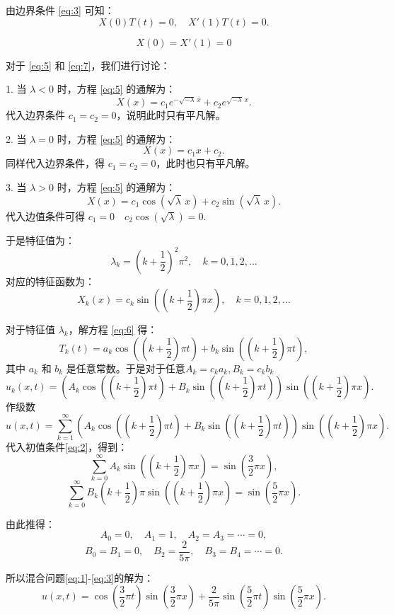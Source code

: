 由边界条件 \eqref{eq:3} 可知：
\begin{equation}
    X(0) T(t) = 0, \quad X'(1) T(t) = 0. \nonumber
\end{equation}

\begin{equation}
X(0) = X'(1) = 0 \label{eq:7}
\end{equation}

对于 \eqref{eq:5} 和 \eqref{eq:7}，我们进行讨论：

1. 当 $\lambda < 0$ 时，方程 \eqref{eq:5} 的通解为：
   \[
   X(x) = c_1 e^{-\sqrt{-\lambda} \, x} + c_2 e^{\sqrt{-\lambda} \, x}.
   \]
   代入边界条件 $c_1 = c_2 = 0$，说明此时只有平凡解。

2. 当 $\lambda = 0$ 时，方程 \eqref{eq:5} 的通解为：
   \[
   X(x) = c_1 x + c_2.
   \]
   同样代入边界条件，得 $c_1 = c_2 = 0$，此时也只有平凡解。

3. 当 $\lambda > 0$ 时，方程 \eqref{eq:5} 的通解为：
   \[
   X(x) = c_1 \cos(\sqrt{\lambda} \, x) + c_2 \sin(\sqrt{\lambda} \, x).
   \]
   代入边值条件可得 $c_1 = 0 \quad c_2 \cos(\sqrt{\lambda}) = 0.$

   于是特征值为：
   \[
   \lambda_k = \left(k + \frac{1}{2}\right)^2 \pi^2, \quad k = 0, 1, 2, \dots
   \]
   对应的特征函数为：
   \[
   X_k(x) = c_k \sin\left(\left(k + \frac{1}{2}\right) \pi x\right), \quad k = 0, 1, 2, \dots
   \]

对于特征值 $\lambda_k$，解方程 \eqref{eq:6} 得：
\[
T_k(t) = a_k \cos\left(\left(k + \frac{1}{2}\right) \pi t\right) + b_k \sin\left(\left(k + \frac{1}{2}\right) \pi t\right),
\]
其中 $a_k$ 和 $b_k$ 是任意常数。于是对于任意$A_k=c_ka_k,B_k=c_kb_k$
\[
u_k(x, t) = \left(A_k \cos\left(\left(k + \frac{1}{2}\right) \pi t\right) + B_k \sin\left(\left(k + \frac{1}{2}\right) \pi t\right)\right) \sin\left(\left(k + \frac{1}{2}\right) \pi x\right).
\]
作级数
\[
u(x, t) = \sum_{k=1}^{\infty} \left(A_k \cos\left(\left(k + \frac{1}{2}\right) \pi t\right) + B_k \sin\left(\left(k + \frac{1}{2}\right) \pi t\right)\right) \sin\left(\left(k + \frac{1}{2}\right) \pi x\right).
\]
代入初值条件\eqref{eq:2}，得到：
\[
\sum_{k=0}^{\infty} A_k \sin\left(\left(k + \frac{1}{2}\right) \pi x\right) = \sin\left(\frac{3}{2} \pi x\right),
\]
\[
\sum_{k=0}^{\infty} B_k \left(k + \frac{1}{2}\right) \pi \sin\left(\left(k + \frac{1}{2}\right) \pi x\right) = \sin\left(\frac{5}{2} \pi x\right).
\]

由此推得：
\[
A_0 = 0, \quad A_1 = 1, \quad A_2 = A_3 = \cdots = 0,
\]
\[
B_0 = B_1 = 0, \quad B_2 = \frac{2}{5\pi}, \quad B_3 = B_4 = \cdots = 0.
\]

所以混合问题\eqref{eq:1}-\eqref{eq:3}的解为：
\[
u(x, t) = \cos\left(\frac{3}{2} \pi t\right) \sin\left(\frac{3}{2} \pi x\right) + \frac{2}{5\pi} \sin\left(\frac{5}{2} \pi t\right) \sin\left(\frac{5}{2} \pi x\right).
\]